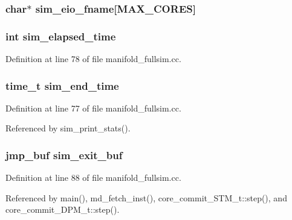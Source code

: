 \subsubsection[{sim\_\-eio\_\-fname}]{\setlength{\rightskip}{0pt plus 5cm}char$\ast$ {\bf sim\_\-eio\_\-fname}[MAX\_\-CORES]}\label{sim_8h_ba89c3962ef5804b8fc49427a39269f7}


\subsubsection[{sim\_\-elapsed\_\-time}]{\setlength{\rightskip}{0pt plus 5cm}int {\bf sim\_\-elapsed\_\-time}}\label{sim_8h_84462569a8ea1951d2547b98eaa30f25}




Definition at line 78 of file manifold\_\-fullsim.cc.
\subsubsection[{sim\_\-end\_\-time}]{\setlength{\rightskip}{0pt plus 5cm}time\_\-t {\bf sim\_\-end\_\-time}}\label{sim_8h_5db757faa4910d3f30bfddc7c81261e8}




Definition at line 77 of file manifold\_\-fullsim.cc.

Referenced by sim\_\-print\_\-stats().
\subsubsection[{sim\_\-exit\_\-buf}]{\setlength{\rightskip}{0pt plus 5cm}jmp\_\-buf {\bf sim\_\-exit\_\-buf}}\label{sim_8h_84727c65b24d2e32fd3d4a7af53aa15a}




Definition at line 88 of file manifold\_\-fullsim.cc.

Referenced by main(), md\_\-fetch\_\-inst(), core\_\-commit\_\-STM\_\-t::step(), and core\_\-commit\_\-DPM\_\-t::step().
